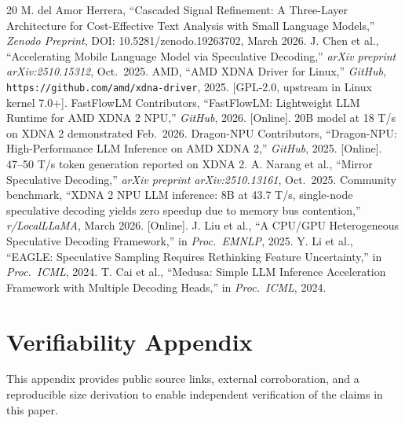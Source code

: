 \documentclass[11pt,a4paper]{article}
\begin{document}
\begin{thebibliography}{20}
 M. del Amor Herrera, ``Cascaded Signal Refinement: A Three-Layer Architecture for Cost-Effective Text Analysis with Small Language Models,'' \textit{Zenodo Preprint}, DOI: 10.5281/zenodo.19263702, March 2026.
 J. Chen et al., ``Accelerating Mobile Language Model via Speculative Decoding,'' \textit{arXiv preprint arXiv:2510.15312}, Oct.~2025.
 AMD, ``AMD XDNA Driver for Linux,'' \textit{GitHub}, \texttt{https://github.com/amd/xdna-driver}, 2025. [GPL-2.0, upstream in Linux kernel 7.0+].
 FastFlowLM Contributors, ``FastFlowLM: Lightweight LLM Runtime for AMD XDNA 2 NPU,'' \textit{GitHub}, 2026. [Online]. 20B model at 18 T/s on XDNA 2 demonstrated Feb.~2026.
 Dragon-NPU Contributors, ``Dragon-NPU: High-Performance LLM Inference on AMD XDNA 2,'' \textit{GitHub}, 2025. [Online]. 47--50 T/s token generation reported on XDNA 2.
 A. Narang et al., ``Mirror Speculative Decoding,'' \textit{arXiv preprint arXiv:2510.13161}, Oct.~2025.
 Community benchmark, ``XDNA 2 NPU LLM inference: 8B at 43.7 T/s, single-node speculative decoding yields zero speedup due to memory bus contention,'' \textit{r/LocalLLaMA}, March 2026. [Online].
 J. Liu et al., ``A CPU/GPU Heterogeneous Speculative Decoding Framework,'' in \textit{Proc.\ EMNLP}, 2025.
 Y. Li et al., ``EAGLE: Speculative Sampling Requires Rethinking Feature Uncertainty,'' in \textit{Proc.\ ICML}, 2024.
 T. Cai et al., ``Medusa: Simple LLM Inference Acceleration Framework with Multiple Decoding Heads,'' in \textit{Proc.\ ICML}, 2024.
\end{thebibliography}

\appendix
\section{Verifiability Appendix}

This appendix provides public source links, external corroboration, and a reproducible size derivation to enable independent verification of the claims in this paper.
\end{document}
